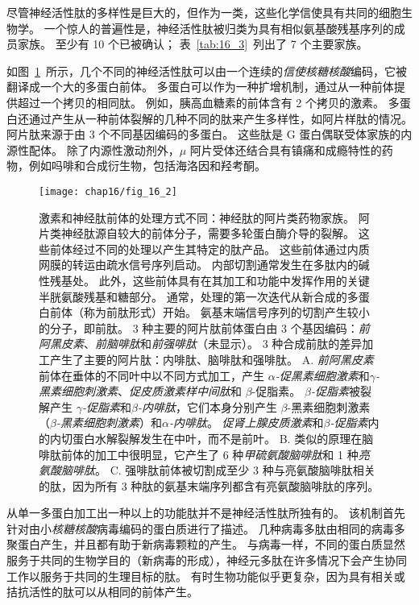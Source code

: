 尽管神经活性肽的多样性是巨大的，但作为一类，这些化学信使具有共同的细胞生物学。
一个惊人的普遍性是，神经活性肽被归类为具有相似氨基酸残基序列的成员家族。
至少有 10 个已被确认；
表~\ref{tab:16_3}~列出了 7 个主要家族。


如图~\ref{fig:16_2}~所示，几个不同的神经活性肽可以由一个连续的\textit{信使核糖核酸}编码，它被翻译成一个大的多蛋白前体。
多蛋白可以作为一种扩增机制，通过从一种前体提供超过一个拷贝的相同肽。
例如，胰高血糖素的前体含有 2 个拷贝的激素。
多蛋白还通过产生从一种前体裂解的几种不同的肽来产生多样性，如阿片样肽的情况。
阿片肽来源于由 3 个不同基因编码的多蛋白。
这些肽是 G 蛋白偶联受体家族的内源性配体。
除了内源性激动剂外，$\mu$ 阿片受体还结合具有镇痛和成瘾特性的药物，例如吗啡和合成衍生物，包括海洛因和羟考酮。


\begin{figure}[htbp]
	\centering
	\texttt{[image: chap16/fig\_16\_2]}
	\caption{激素和神经肽前体的处理方式不同：神经肽的阿片类药物家族。
		阿片类神经肽源自较大的前体分子，需要多轮蛋白酶介导的裂解。
		这些前体经过不同的处理以产生其特定的肽产品。
		这些前体通过内质网膜的转运由疏水信号序列启动。
		内部切割通常发生在多肽内的碱性残基处。
		此外，这些前体具有在其加工和功能中发挥作用的关键半胱氨酸残基和糖部分。
		通常，处理的第一次迭代从新合成的多蛋白前体（称为前肽形式）开始。
		氨基末端信号序列的切割产生较小的分子，即前肽。
		3 种主要的阿片肽前体蛋白由 3 个基因编码：\textit{前阿黑皮素}、\textit{前脑啡肽}和\textit{前强啡肽}（未显示）。
		3 种合成前肽的差异加工产生了主要的阿片肽：内啡肽、脑啡肽和强啡肽。
		A. \textit{前阿黑皮素}前体在垂体的不同叶中以不同方式加工，产生 \textit{$\alpha$-促黑素细胞激素}和\textit{$\gamma$-黑素细胞刺激素}、\textit{促皮质激素样中间肽}和 $\beta$-促脂素。 
		\textit{$\beta$-促脂素}被裂解产生 \textit{$\gamma$-促脂素}和\textit{$\beta$-内啡肽}，它们本身分别产生 $\beta$-黑素细胞刺激素（\textit{$\beta$-黑素细胞刺激素}）和\textit{$\alpha$-内啡肽}。
		\textit{促肾上腺皮质激素}和\textit{$\beta$-促脂素}内的内切蛋白水解裂解发生在中叶，而不是前叶。
		B. 类似的原理在脑啡肽前体的加工中很明显，它产生了 6 种\textit{甲硫氨酸脑啡肽}和 1 种\textit{亮氨酸脑啡肽}。
		C. 强啡肽前体被切割成至少 3 种与亮氨酸脑啡肽相关的肽，因为所有 3 种肽的氨基末端序列都含有亮氨酸脑啡肽的序列。}
	\label{fig:16_2}
\end{figure}


从单一多蛋白加工出一种以上的功能肽并不是神经活性肽所独有的。
该机制首先针对由小\textit{核糖核酸}病毒编码的蛋白质进行了描述。
几种病毒多肽由相同的病毒多聚蛋白产生，并且都有助于新病毒颗粒的产生。
与病毒一样，不同的蛋白质显然服务于共同的生物学目的（新病毒的形成），神经元多肽在许多情况下会产生协同工作以服务于共同的生理目标的肽。
有时生物功能似乎更复杂，因为具有相关或拮抗活性的肽可以从相同的前体产生。


